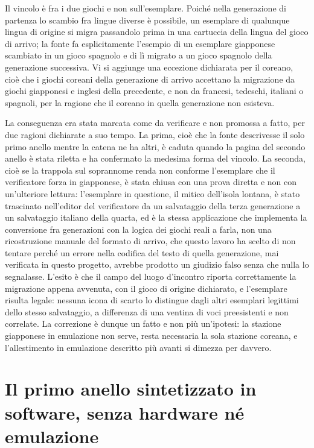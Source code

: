 Il vincolo è fra i due giochi e non sull'esemplare. Poiché nella generazione di partenza lo scambio fra lingue diverse è possibile, un esemplare di qualunque lingua di origine si migra passandolo prima in una cartuccia della lingua del gioco di arrivo; la fonte fa esplicitamente l'esempio di un esemplare giapponese scambiato in un gioco spagnolo e di lì migrato a un gioco spagnolo della generazione successiva. Vi si aggiunge una eccezione dichiarata per il coreano, cioè che i giochi coreani della generazione di arrivo accettano la migrazione da giochi giapponesi e inglesi della precedente, e non da francesi, tedeschi, italiani o spagnoli, per la ragione che il coreano in quella generazione non esisteva.

La conseguenza era stata marcata come da verificare e non promossa a fatto, per due ragioni dichiarate a suo tempo. La prima, cioè che la fonte descrivesse il solo primo anello mentre la catena ne ha altri, è caduta quando la pagina del secondo anello è stata riletta e ha confermato la medesima forma del vincolo. La seconda, cioè se la trappola sul soprannome renda non conforme l'esemplare che il verificatore forza in giapponese, è stata chiusa con una prova diretta e non con un'ulteriore lettura: l'esemplare in questione, il mitico dell'isola lontana, è stato trascinato nell'editor del verificatore da un salvataggio della terza generazione a un salvataggio italiano della quarta, ed è la stessa applicazione che implementa la conversione fra generazioni con la logica dei giochi reali a farla, non una ricostruzione manuale del formato di arrivo, che questo lavoro ha scelto di non tentare perché un errore nella codifica del testo di quella generazione, mai verificata in questo progetto, avrebbe prodotto un giudizio falso senza che nulla lo segnalasse. L'esito è che il campo del luogo d'incontro riporta correttamente la migrazione appena avvenuta, con il gioco di origine dichiarato, e l'esemplare risulta legale: nessuna icona di scarto lo distingue dagli altri esemplari legittimi dello stesso salvataggio, a differenza di una ventina di voci preesistenti e non correlate. La correzione è dunque un fatto e non più un'ipotesi: la stazione giapponese in emulazione non serve, resta necessaria la sola stazione coreana, e l'allestimento in emulazione descritto più avanti si dimezza per davvero.

\section{Il primo anello sintetizzato in software, senza hardware né emulazione}

